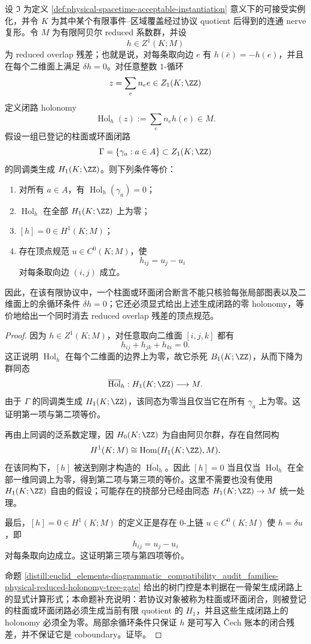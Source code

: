 \begin{proposition}\label{distill:cech_cohomology-holonomy_residue_classification-physical-cylinder-torus-generator-gate}
设 \(\mathfrak I\) 为定义 \ref{def:physical-spacetime-acceptable-instantiation} 意义下的可接受实例化，并令 \(K\) 为其中某个有限事件--区域覆盖经过协议 quotient 后得到的连通 nerve 复形。令 \(M\) 为有限阿贝尔 reduced 系数群，并设
\[
h\in Z^1(K;M)
\]
为 reduced overlap 残差；也就是说，对每条取向边 \(e\) 有 \(h(\bar e)=-h(e)\)，并且在每个二维面上满足 \(\delta h=0\)。对任意整数 \(1\)-循环
\[
z=\sum_e n_e e\in Z_1(K;\ZZ)
\]
定义闭路 holonomy
\[
\operatorname{Hol}_h(z):=\sum_e n_e h(e)\in M.
\]
假设一组已登记的柱面或环面闭路
\[
\Gamma=\{\gamma_a:a\in A\}\subset Z_1(K;\ZZ)
\]
的同调类生成 \(H_1(K;\ZZ)\)。则下列条件等价：
\begin{enumerate}
  \item 对所有 \(a\in A\)，有 \(\operatorname{Hol}_h(\gamma_a)=0\)；
  \item \(\operatorname{Hol}_h\) 在全部 \(H_1(K;\ZZ)\) 上为零；
  \item \([h]=0\in H^1(K;M)\)；
  \item 存在顶点规范 \(u\in C^0(K;M)\)，使
  \[
  h_{ij}=u_j-u_i
  \]
  对每条取向边 \((i,j)\) 成立。
\end{enumerate}
因此，在该有限协议中，一个柱面或环面闭合断言不能只核验每张局部图表以及二维面上的余循环条件 \(\delta h=0\)；它还必须显式给出上述生成闭路的零 holonomy，等价地给出一个同时消去 reduced overlap 残差的顶点规范。
\end{proposition}
\begin{proof}
因为 \(h\in Z^1(K;M)\)，对任意取向二维面 \([i,j,k]\) 都有
\[
h_{ij}+h_{jk}+h_{ki}=0.
\]
这正说明 \(\operatorname{Hol}_h\) 在每个二维面的边界上为零，故它杀死 \(B_1(K;\ZZ)\)，从而下降为群同态
\[
\overline{\operatorname{Hol}}_h:H_1(K;\ZZ)\longrightarrow M.
\]
由于 \(\Gamma\) 的同调类生成 \(H_1(K;\ZZ)\)，该同态为零当且仅当它在所有 \(\gamma_a\) 上为零。这证明第一项与第二项等价。

再由上同调的泛系数定理，因 \(H_0(K;\ZZ)\) 为自由阿贝尔群，存在自然同构
\[
H^1(K;M)\cong \operatorname{Hom}(H_1(K;\ZZ),M).
\]
在该同构下，\([h]\) 被送到刚才构造的 \(\overline{\operatorname{Hol}}_h\)。因此 \([h]=0\) 当且仅当 \(\operatorname{Hol}_h\) 在全部一维同调上为零，得到第二项与第三项的等价。这里不需要也没有使用 \(H_1(K;\ZZ)\) 自由的假设；可能存在的挠部分已经由同态 \(H_1(K;\ZZ)\to M\) 统一处理。

最后，\([h]=0\in H^1(K;M)\) 的定义正是存在 \(0\)-上链 \(u\in C^0(K;M)\) 使 \(h=\delta u\)，即
\[
h_{ij}=u_j-u_i
\]
对每条取向边成立。这证明第三项与第四项等价。

命题 \ref{distill:euclid_elements-diagrammatic_compatibility_audit_families-physical-reduced-holonomy-tree-gate} 给出的树门控是本判据在一骨架生成闭路上的显式计算形式；本命题补充说明：若协议对象被称为柱面或环面闭合，则被登记的柱面或环面闭路必须生成当前有限 quotient 的 \(H_1\)，并且这些生成闭路上的 holonomy 必须全为零。局部余循环条件只保证 \(h\) 是可写入 \v{C}ech 账本的闭合残差，并不保证它是 coboundary。证毕。
\end{proof}

